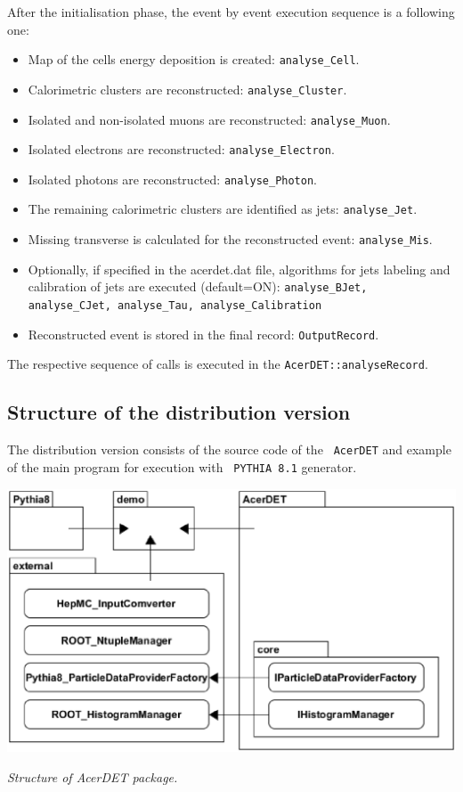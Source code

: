 After the initialisation phase, the event by event execution sequence
 is a following one: 
\begin{itemize}
\item
Map of the cells energy deposition is created: {\tt analyse\_Cell}.
\item
Calorimetric clusters are reconstructed: {\tt analyse\_Cluster}.
\item
Isolated and non-isolated muons are reconstructed: {\tt analyse\_Muon}.
\item
Isolated electrons are reconstructed: {\tt analyse\_Electron}.
\item
Isolated photons are reconstructed: {\tt analyse\_Photon}.
\item
The remaining calorimetric clusters are identified as jets: {\tt analyse\_Jet}.
\item
Missing transverse is calculated for the reconstructed event: {\tt analyse\_Mis}.
\item
Optionally, if specified in the acerdet.dat file, algorithms for 
jets labeling and calibration of jets are executed (default=ON): 
{\tt analyse\_BJet, analyse\_CJet, analyse\_Tau, analyse\_Calibration}
\item
Reconstructed event is stored in the final record: {\tt OutputRecord}.
\end{itemize}


The respective sequence of calls is executed in the {\tt AcerDET::analyseRecord}.

\subsection{Structure of the distribution version}

The distribution version consists of the source code of the {\tt
AcerDET} and example of the main program for execution with {\tt
PYTHIA 8.1} generator. 

\begin{Fighere}
\begin{center}
{
   \includegraphics[width=15.0cm,angle=0]{acerdet_structure.eps}\\
}
\end{center}
\caption{\em
Structure of AcerDET package.
\label{acerDETstructure}} 
\end{Fighere}


